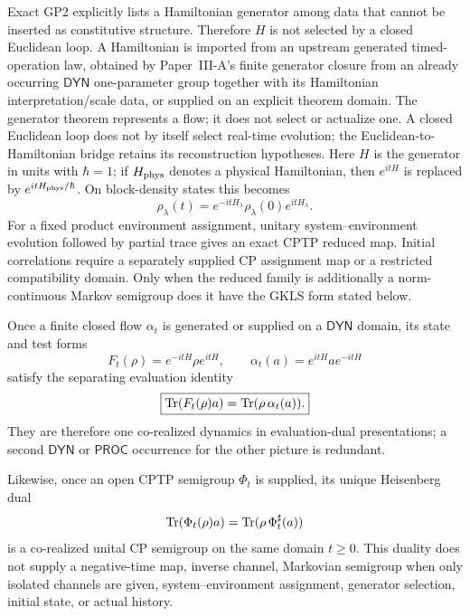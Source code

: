 \documentclass[12pt,a4paper]{article}
\begin{document}
Exact GP2 explicitly lists a Hamiltonian generator among data that cannot be
inserted as constitutive structure.  Therefore \(H\) is not selected by a
closed Euclidean loop.  A Hamiltonian is imported from an upstream generated
timed-operation law, obtained by Paper~III-A's finite generator closure from
an already occurring \(\mathsf{DYN}\) one-parameter group together with its
Hamiltonian interpretation/scale data, or supplied on an explicit theorem
domain.  The generator theorem represents a flow; it does not select or
actualize one.  A closed Euclidean loop does not by itself select real-time
evolution; the Euclidean-to-Hamiltonian bridge retains its reconstruction
hypotheses.
Here $H$ is the generator in units with $\hbar=1$; if $H_{\rm phys}$ denotes a physical Hamiltonian, then $e^{itH}$ is replaced by $e^{itH_{\rm phys}/\hbar}$.
On block-density states this becomes
\begin{equation}
\label{p4:eq:schrodinger-flow}
\rho_\lambda(t)=e^{-itH_\lambda}\rho_\lambda(0)e^{itH_\lambda}.
\end{equation}
For a fixed product environment assignment, unitary system--environment
evolution followed by partial trace gives an exact CPTP reduced map.  Initial
correlations require a separately supplied CP assignment map or a restricted
compatibility domain.  Only when the reduced family is additionally a
norm-continuous Markov semigroup does it have the GKLS form stated below.

\begin{corollary}
\label{p4:cor:schrodinger-heisenberg-one-corealized-dynamics}
Once a finite closed flow \(\alpha_t\) is generated or supplied on a
\(\mathsf{DYN}\) domain, its state and test forms
\[
 F_t(\rho)=e^{-itH}\rho e^{itH},
 \qquad
 \alpha_t(a)=e^{itH}ae^{-itH}
\]
satisfy the separating evaluation identity
\[
 \boxed{\operatorname{Tr}(F_t(\rho)a)=\operatorname{Tr}(\rho\,\alpha_t(a)).}
\]
They are therefore one co-realized dynamics in evaluation-dual
presentations; a second \(\mathsf{DYN}\) or \(\mathsf{PROC}\) occurrence for
the other picture is redundant.

Likewise, once an open CPTP semigroup \(\Phi_t\) is supplied, its unique
Heisenberg dual
\[
 \operatorname{Tr}(\Phi_t(\rho)a)=\operatorname{Tr}(\rho\,\Phi_t^\sharp(a))
\]
is a co-realized unital CP semigroup on the same domain \(t\ge0\).  This
duality does not supply a negative-time map, inverse channel, Markovian
semigroup when only isolated channels are given, system--environment
assignment, generator selection, initial state, or actual history.
\end{corollary}
\end{document}
